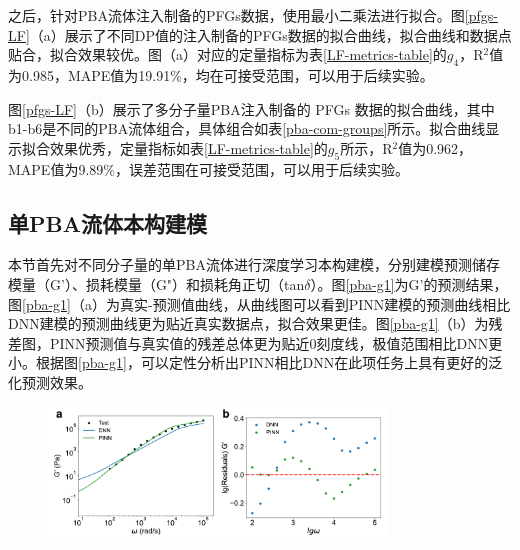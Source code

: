 之后，针对PBA流体注入制备的PFGs数据，使用最小二乘法进行拟合。图\ref{pfgs-LF}（a）展示了不同DP值的注入制备的PFGs数据的拟合曲线，拟合曲线和数据点贴合，拟合效果较优。图（a）对应的定量指标为表\ref{LF-metrics-table}的$g_4$，R$^2$值为0.985，MAPE值为19.91\%，均在可接受范围，可以用于后续实验。

图\ref{pfgs-LF}（b）展示了多分子量PBA注入制备的 PFGs 数据的拟合曲线，其中b1-b6是不同的PBA流体组合，具体组合如表\ref{pba-com-groups}所示。拟合曲线显示拟合效果优秀，定量指标如表\ref{LF-metrics-table}的$g_5$所示，R$^2$值为0.962，MAPE值为9.89\%，误差范围在可接受范围，可以用于后续实验。


\subsection{单PBA流体本构建模}
本节首先对不同分子量的单PBA流体进行深度学习本构建模，分别建模预测储存模量（G'）、损耗模量（G"）和损耗角正切（tan$\delta$）。图\ref{pba-g1}为G'的预测结果，图\ref{pba-g1}（a）为真实-预测值曲线，从曲线图可以看到PINN建模的预测曲线相比DNN建模的预测曲线更为贴近真实数据点，拟合效果更佳。图\ref{pba-g1}（b）为残差图，PINN预测值与真实值的残差总体更为贴近0刻度线，极值范围相比DNN更小。根据图\ref{pba-g1}，可以定性分析出PINN相比DNN在此项任务上具有更好的泛化预测效果。
\begin{figure}[htbp]
  \centering
  \includegraphics[width=0.8\textwidth]{Fig/pba-g1.pdf}
\end{figure}

